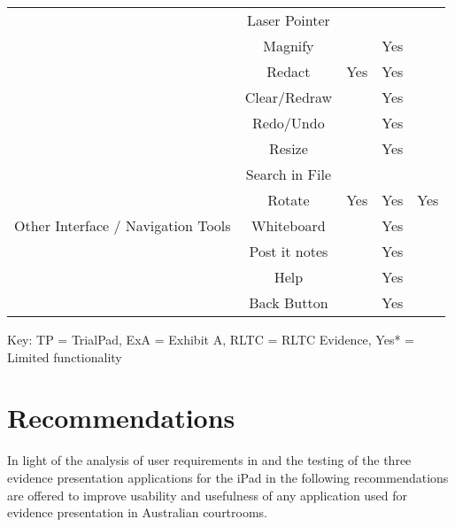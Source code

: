 \begin{center}
\begin{table}[htbp]
\begin{tabular}{|l| c|| c| c| c |}
 \cline{2-5}
& Laser Pointer&&&\\
\cline{2-5}
&Magnify &&Yes&\\
\cline{2-5}
&Redact&Yes&Yes&\\
\cline{2-5}
&Clear/Redraw&&Yes&\\
\cline{2-5}
&Redo/Undo&&Yes&\\
\hline
\multirow{7}{*}{Other Interface / Navigation Tools} & Resize  & &Yes& \\
\cline{2-5}
 &Search in File&&&\\
 \cline{2-5}
 &Rotate&Yes&Yes&Yes\\
 \cline{2-5}
 &Whiteboard&&Yes&\\
 \cline{2-5}
 &Post it notes&&Yes&\\
 \cline{2-5}
 &Help&&Yes&\\
 \cline{2-5}
 &Back Button&&Yes&\\
\hline
\end{tabular}
\end{table}



Key: TP = TrialPad, ExA = Exhibit A, RLTC = RLTC Evidence, Yes* = Limited functionality
\end{center}


\section{Recommendations}
\doublespace
In light of the analysis of user requirements in  and the testing of the three evidence presentation applications for the iPad in  the following recommendations are offered to improve usability and usefulness of any application used for evidence presentation in Australian courtrooms.

